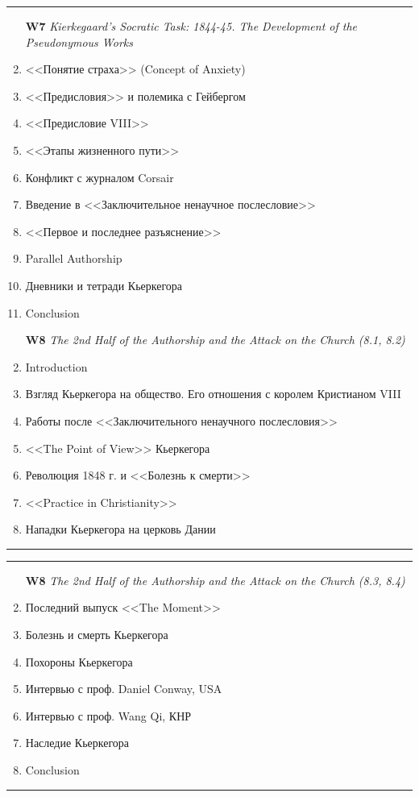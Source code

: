 \documentclass[a4paper]{article}
\begin{document}
\hrule
\begin{enumerate}
\item[\bf W7] \textsl{Kierkegaard’s Socratic Task: 1844-45. The Development of the Pseudonymous Works}
\setcounter{enumi}{2}
\item <<Понятие страха>> (Concept of Anxiety)
\item <<Предисловия>> и полемика с Гейбергом
\item <<Предисловие VIII>>
\item <<Этапы жизненного пути>>
\item Конфликт с журналом Corsair
\item Введение в <<Заключительное ненаучное послесловие>>
\item <<Первое и последнее разъяснение>>
\item Parallel Authorship
\item Дневники и тетради Кьеркегора
\item Conclusion
\end{enumerate}

\begin{enumerate}
\item[\bf W8] \textsl{The 2nd Half of the Authorship and the Attack on the Church (8.1, 8.2)}
\item Introduction
\item Взгляд Кьеркегора на общество. Его отношения с королем Кристианом VIII
\item Работы после <<Заключительного ненаучного послесловия>>
\item <<The Point of View>> Кьеркегора
\item Революция 1848 г. и <<Болезнь к смерти>>
\item <<Practice in Christianity>>
\item Нападки Кьеркегора на церковь Дании
\end{enumerate}
\hrule
\newpage

\hrule
\begin{enumerate}
\item[\bf W8] \textsl{The 2nd Half of the Authorship and the Attack on the Church (8.3, 8.4)}
\setcounter{enumi}{7}
\item Последний выпуск <<The Moment>>
\item Болезнь и смерть Кьеркегора
\item Похороны Кьеркегора
\item Интервью с проф. Daniel Conway, USA
\item Интервью с проф. Wang Qi, КНР
\item Наследие Кьеркегора
\item Conclusion
\end{enumerate}
\hrule
\end{document}
